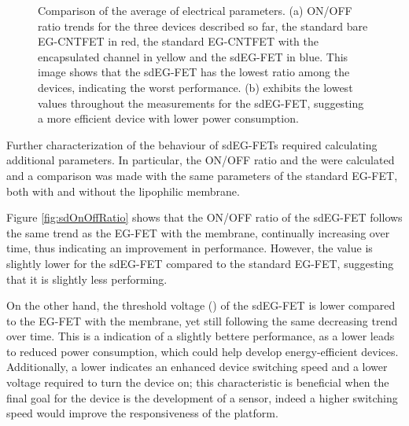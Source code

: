 \begin{figure}
    \centering
    \hfill
    \caption{Comparison of the average of electrical parameters.
        (a) ON/OFF ratio trends for the three devices described so far, \ie{} the standard bare EG-CNTFET in red, the standard EG-CNTFET with the encapsulated channel in yellow and the sdEG-FET in blue. This image shows that the sdEG-FET has the lowest ratio among the devices, indicating the worst performance. 
        (b) \vth{} exhibits the lowest values throughout the measurements for the sdEG-FET, suggesting a more efficient device with lower power consumption.}
    \label{fig:avgSdParams}
\end{figure}

Further characterization of the behaviour of sdEG-FETs required calculating additional parameters. In particular, the ON/OFF ratio and the \vth{} were calculated and a comparison was made with the same parameters of the standard EG-FET, both with and without the lipophilic membrane.

Figure \ref{fig:sdOnOffRatio} shows that the ON/OFF ratio of the sdEG-FET follows the same trend as the EG-FET with the membrane, continually increasing over time, thus indicating an improvement in performance. However, the value is slightly lower for the sdEG-FET compared to the standard EG-FET, suggesting that it is slightly less performing.

On the other hand, the threshold voltage (\vth{}) of the sdEG-FET is lower compared to the EG-FET with the membrane, yet still following the same decreasing trend over time. This is a indication of a slightly bettere performance, as a lower \vth{} leads to reduced power consumption, which could help develop energy-efficient devices. Additionally, a lower \vth{} indicates an enhanced device switching speed and a lower voltage required to turn the device on; this characteristic is beneficial when the final goal for the device is the development of a sensor, indeed a higher switching speed would improve the responsiveness of the platform.

